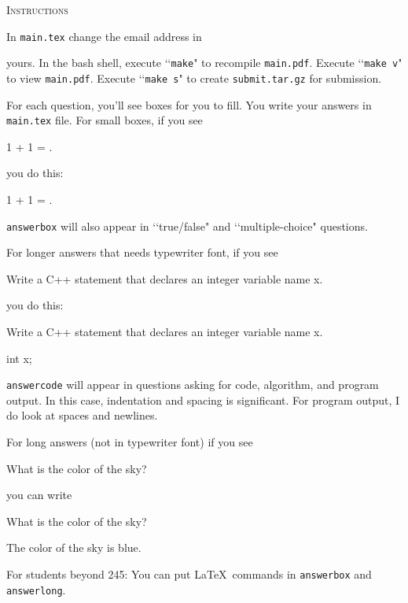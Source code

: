 
\textsc{Instructions}

In \verb!main.tex! change the email address in
\begin{console}
\renewcommand\AUTHOR{jdoe5@cougars.ccis.edu} 
\end{console}
yours.
In the bash shell, execute \lq\lq \verb!make!" to recompile \verb!main.pdf!.
Execute \lq\lq \verb!make v!" to view \verb!main.pdf!.
Execute \lq\lq \verb!make s!" to create \verb!submit.tar.gz! for submission.

For each question, you'll see boxes for you to fill.
You write your answers in \verb!main.tex! file.
For small boxes, if you see
\begin{console}[frame=single=single,fontsize=\small]
1 + 1 = \answerbox{}.
\end{console}
you do this:
\begin{console}[frame=single=single,fontsize=\small]
1 + 1 = .
\end{console}
\verb!answerbox! will also appear in
\lq\lq true/false" and \lq\lq multiple-choice"
questions.

For longer answers that needs typewriter font, if you see
\begin{console}[frame=single=single, fontsize=\small]
Write a C++ statement that declares an integer variable name x.
\begin{answercode}
\end{answercode}
\end{console}
you do this:
\begin{console}[frame=single=single, fontsize=\small]
Write a C++ statement that declares an integer variable name x.
\begin{answercode}
int x;
\end{answercode}
\end{console}
\verb!answercode! will appear in questions asking for
code, algorithm, and program output.
In this case, indentation and spacing is significant.
For program output, I do look at spaces and newlines.

For long answers (not in typewriter font) if you see
\begin{console}[frame=single=single, fontsize=\small]
What is the color of the sky?
\begin{answerlong}
\end{answerlong}
\end{console}
you can write
\begin{console}[frame=single=single, fontsize=\small]
What is the color of the sky?
\begin{answerlong}
The color of the sky is blue.
\end{answerlong}
\end{console}
For students beyond 245: You can put \LaTeX\ commands in
\verb!answerbox! and 
\verb!answerlong!.

